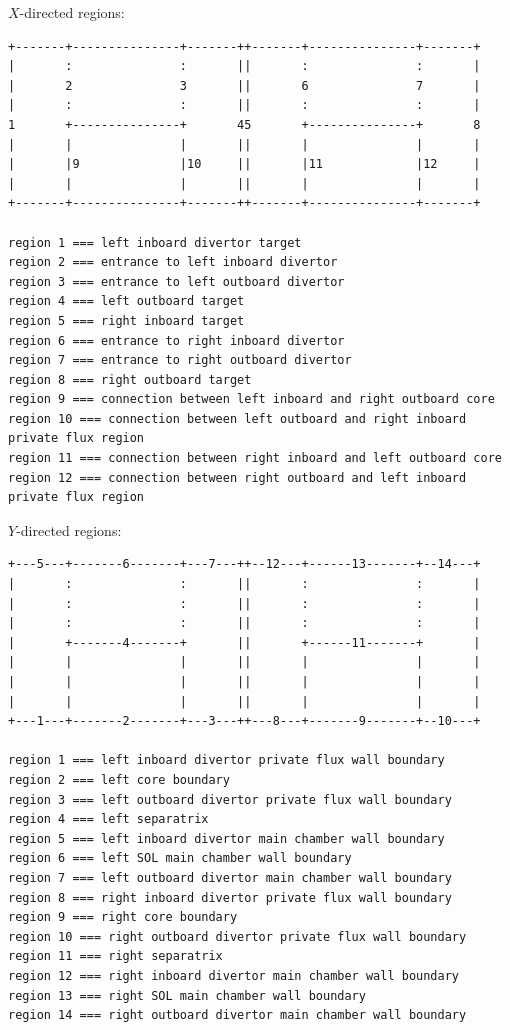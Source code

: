 \documentclass[a4paper,10pt]{report}
\begin{document}
$X$-directed regions:
\begin{verbatim}
+-------+---------------+-------++-------+---------------+-------+
|       :               :       ||       :               :       |
|       2               3       ||       6               7       |
|       :               :       ||       :               :       |
1       +---------------+       45       +---------------+       8
|       |               |       ||       |               |       |
|       |9              |10     ||       |11             |12     |
|       |               |       ||       |               |       |
+-------+---------------+-------++-------+---------------+-------+

region 1 === left inboard divertor target
region 2 === entrance to left inboard divertor
region 3 === entrance to left outboard divertor
region 4 === left outboard target
region 5 === right inboard target
region 6 === entrance to right inboard divertor
region 7 === entrance to right outboard divertor
region 8 === right outboard target
region 9 === connection between left inboard and right outboard core
region 10 === connection between left outboard and right inboard private flux region
region 11 === connection between right inboard and left outboard core
region 12 === connection between right outboard and left inboard private flux region
\end{verbatim}

\clearpage
$Y$-directed regions:
\begin{verbatim}
+---5---+-------6-------+---7---++--12---+------13-------+--14---+
|       :               :       ||       :               :       |
|       :               :       ||       :               :       |
|       :               :       ||       :               :       |
|       +-------4-------+       ||       +------11-------+       |
|       |               |       ||       |               |       |
|       |               |       ||       |               |       |
|       |               |       ||       |               |       |
+---1---+-------2-------+---3---++---8---+-------9-------+--10---+

region 1 === left inboard divertor private flux wall boundary
region 2 === left core boundary
region 3 === left outboard divertor private flux wall boundary
region 4 === left separatrix
region 5 === left inboard divertor main chamber wall boundary
region 6 === left SOL main chamber wall boundary
region 7 === left outboard divertor main chamber wall boundary
region 8 === right inboard divertor private flux wall boundary
region 9 === right core boundary
region 10 === right outboard divertor private flux wall boundary
region 11 === right separatrix
region 12 === right inboard divertor main chamber wall boundary
region 13 === right SOL main chamber wall boundary
region 14 === right outboard divertor main chamber wall boundary
\end{verbatim}
\end{document}
